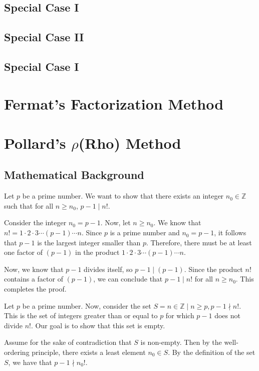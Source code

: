 \documentclass[12pt,openany]{book}
\theoremstyle{definition}
\begin{document}
	\subsection{Special Case I}
	
	\subsection{Special Case II}
	\subsection{Special Case I}

	\section{Fermat's Factorization Method}
	
	
	\section{Pollard's $\rho$(Rho) Method}
	
	\subsection*{Mathematical Background}
	
	Let $p$ be a prime number. We want to show that there exists an integer $n_0 \in \mathbb{Z}$ such that for all $n \geq n_0$, $p-1 \mid n!$. 
	
	Consider the integer $n_0 = p - 1$. Now, let $n \geq n_0$. We know that $n! = 1 \cdot 2 \cdot 3 \cdots (p-1) \cdots n$. Since $p$ is a prime number and $n_0 = p - 1$, it follows that $p-1$ is the largest integer smaller than $p$. Therefore, there must be at least one factor of $(p-1)$ in the product $1 \cdot 2 \cdot 3 \cdots (p-1) \cdots n$. 
	
	Now, we know that $p-1$ divides itself, so $p-1 \mid (p-1)$. Since the product $n!$ contains a factor of $(p-1)$, we can conclude that $p-1 \mid n!$ for all $n \geq n_0$. This completes the proof.
	
	\newpage
	Let $p$ be a prime number. Now, consider the set $S = {n \in \mathbb{Z} \mid n \geq p, p-1 \nmid n!}$. This is the set of integers greater than or equal to $p$ for which $p-1$ does not divide $n!$. Our goal is to show that this set is empty.
	
	Assume for the sake of contradiction that $S$ is non-empty. Then by the well-ordering principle, there exists a least element $n_0 \in S$. By the definition of the set $S$, we have that $p-1 \nmid n_0!$.
	
\end{document}
